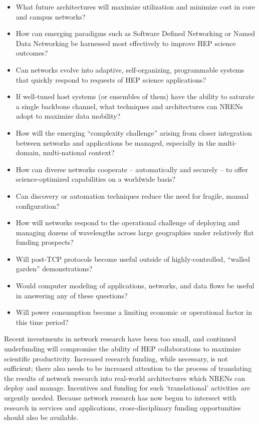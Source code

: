 \begin{itemize}
\item What future architectures will maximize utilization and minimize cost in core and campus networks?
\item How can emerging paradigms such as Software Defined Networking or Named Data Networking be harnessed most effectively to improve HEP science outcomes?
\item Can networks evolve into adaptive, self-organizing, programmable systems that quickly respond to requests of HEP science applications? 
\item If well-tuned host systems (or ensembles of them) have the ability to saturate a single backbone channel, what techniques and architectures can NRENs adopt to maximize data mobility?
\item How will the emerging “complexity challenge” arising from closer integration between networks and applications be managed, especially in the multi-domain, multi-national context?
\item How can diverse networks cooperate – automatically and securely – to offer science-optimized capabilities on a worldwide basis? 
\item Can discovery or automation techniques reduce the need for fragile, manual configuration? 
\item How will networks respond to the operational challenge of deploying  and managing dozens of wavelengths across large geographies under relatively flat funding prospects? 
\item Will post-TCP protocols become useful outside of highly-controlled, “walled garden” demonstrations? 
\item Would computer modeling of applications, networks, and data flows be useful in answering any of these questions?  
\item Will power consumption become a limiting economic or operational factor in this time period? 
\end{itemize}

Recent investments in network research have been too small, and continued underfunding will compromise the ability of HEP collaborations to maximize scientific productivity. Increased research funding, while necessary, is not sufficient; there also needs to be increased attention to the process of translating the results of network research into real-world architectures which NRENs can deploy and manage. Incentives and funding for such ‘translational’ activities are urgently needed. Because network research has now begun to intersect with research in services and applications, cross-disciplinary funding opportunities should also be available.  

